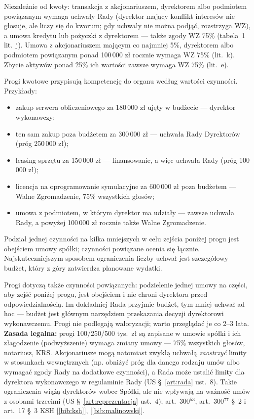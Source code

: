 \documentclass[11pt,a4paper]{report}
\newcommand{\Zr}[1]{[\ref{bib:#1}]}
\begin{document}
Niezależnie od kwoty: transakcja z akcjonariuszem, dyrektorem albo podmiotem powiązanym wymaga uchwały Rady (dyrektor mający konflikt interesów nie głosuje, ale liczy się do kworum; gdy uchwały nie można podjąć, rozstrzyga WZ), a umowa kredytu lub pożyczki z dyrektorem --- także zgody WZ 75\% (tabela~1 lit.~j). Umowa z akcjonariuszem mającym co najmniej 5\%, dyrektorem albo podmiotem powiązanym ponad 100\,000 zł rocznie wymaga WZ 75\% (lit.~k). Zbycie aktywów ponad 25\% ich wartości zawsze wymaga WZ 75\% (lit.~e).

\begin{OCoChodzi}
Progi kwotowe przypisują kompetencję do organu według wartości czynności. Przykłady:
\begin{itemize}
  \item zakup serwera obliczeniowego za 180\,000 zł ujęty w budżecie --- dyrektor wykonawczy;
  \item ten sam zakup poza budżetem za 300\,000 zł --- uchwała Rady Dyrektorów (próg 250\,000 zł);
  \item leasing sprzętu za 150\,000 zł --- finansowanie, a więc uchwała Rady (próg 100\,000 zł);
  \item licencja na oprogramowanie symulacyjne za 600\,000 zł poza budżetem --- Walne Zgromadzenie, 75\% wszystkich głosów;
  \item umowa z podmiotem, w którym dyrektor ma udziały --- zawsze uchwała Rady, a powyżej 100\,000 zł rocznie także Walne Zgromadzenie.
\end{itemize}
Podział jednej czynności na kilka mniejszych w celu zejścia poniżej progu jest obejściem umowy spółki; czynności powiązane ocenia się łącznie. Najskuteczniejszym sposobem ograniczenia liczby uchwał jest szczegółowy budżet, który z góry zatwierdza planowane wydatki.
\end{OCoChodzi}

\begin{Komentarz}
Progi dotyczą także czynności powiązanych: podzielenie jednej umowy na części, aby zejść poniżej progu, jest obejściem i nie chroni dyrektora przed odpowiedzialnością. Im dokładniej Rada przyjmie budżet, tym mniej uchwał ad hoc --- budżet jest głównym narzędziem przekazania decyzji dyrektorowi wykonawczemu. Progi nie podlegają waloryzacji; warto przeglądać je co 2--3 lata. \textbf{Zasada legalna:} progi 100/250/500 tys.\ zł są zapisane w umowie spółki i ich złagodzenie (podwyższenie) wymaga zmiany umowy --- 75\% wszystkich głosów, notariusz, KRS. Akcjonariusze mogą natomiast zwykłą uchwałą \emph{zaostrzyć} limity w stosunkach wewnętrznych (np. obniżyć próg dla danego rodzaju umów albo wymagać zgody Rady na dodatkowe czynności), a Rada może ustalić limity dla dyrektora wykonawczego w regulaminie Rady (US §~\ref{art:rada} ust.~8). Takie ograniczenia wiążą dyrektorów wobec Spółki, ale nie wpływają na ważność umów z osobami trzecimi (US §~\ref{art:reprezentacja} ust.~4); art.~300$^{53}$, art.~300$^{77}$ §~2 i art.~17 §~3 KSH \Zr{ksh}, \Zr{malinowski}.
\end{Komentarz}
\end{document}
